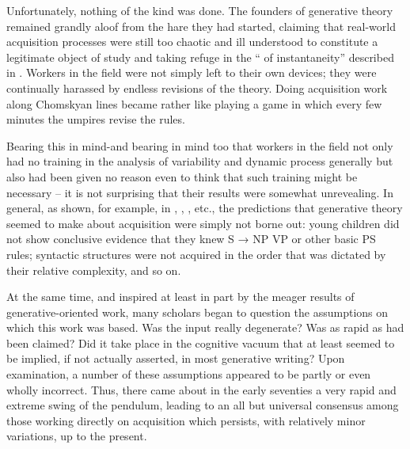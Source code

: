 Unfortunately, nothing of the kind was done. The founders of generative theory remained grandly aloof from the hare they had started, claiming that real-world acquisition processes were still too chaotic and ill understood to constitute a legitimate object of study and taking refuge in the `` of instantaneity'' described in \cite[Chapter 7]{ChomskyEtAl1968}. Workers in the field were not simply left to their own devices; they were continually harassed by endless revisions of the theory. Doing acquisition work along Chomskyan lines became rather like playing a game in which every few minutes the umpires revise the rules.

Bearing this in mind-and bearing in mind too that workers in the field not only had no training in the analysis of variability and dynamic process generally but also had been given no reason even to think that such training might be necessary -- it is not surprising that their results were somewhat unrevealing. In general, as shown, for example, in \citet{BrownEtAl1970}, \citet{Brown1973}, \citet{Bowerman1973}, etc., the predictions that generative theory seemed to make about acquisition were simply not borne out: young children did not show conclusive evidence that they knew S → NP VP or other basic PS
rules; syntactic structures were not acquired in the order that was dictated by their relative complexity, and so on.

At the same time, and inspired at least in part by the meager results of generative-oriented work, many scholars began to question the assumptions on which this work was based. Was the input really degenerate? Was  as rapid as had been claimed? Did it take place in the cognitive vacuum that at least seemed to be implied, if not actually asserted, in most generative writing? Upon examination, a number of these assumptions appeared to be partly or even wholly incorrect. Thus, there came about in the early seventies a very rapid and extreme swing of the pendulum, leading to an all but universal consensus among those working directly on acquisition which persists, with relatively minor variations, up to the present.

